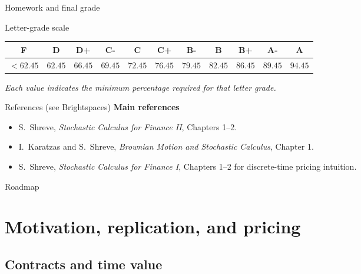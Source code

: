 \documentclass[handout,10pt,aspectratio=169]{beamer}
\begin{document}
\begin{frame}{Homework and final grade}
\begin{block}{Letter-grade scale}
\centering
\scriptsize
\renewcommand{\arraystretch}{0.95}
\begin{tabular}{@{}ccccccccccc@{}}
\toprule
\textbf{F} & \textbf{D} & \textbf{D+} & \textbf{C-} &
\textbf{C} & \textbf{C+} & \textbf{B-} & \textbf{B} &
\textbf{B+} & \textbf{A-} & \textbf{A} \\
\midrule
$<62.45$ &
$62.45$ &
$66.45$ &
$69.45$ &
$72.45$ &
$76.45$ &
$79.45$ &
$82.45$ &
$86.45$ &
$89.45$ &
$94.45$ \\
\bottomrule
\end{tabular}

\vspace{0.05em}
\textit{Each value indicates the minimum percentage required for that letter grade.}
\end{block}

\end{frame}

\begin{frame}{References (see Brightspaces)}
\footnotesize
\textbf{Main references}
\begin{itemize}\setlength{\itemsep}{0.5em}
  \item S.~Shreve, \emph{Stochastic Calculus for Finance II}, Chapters 1--2.
  \item I.~Karatzas and S.~Shreve, \emph{Brownian Motion and Stochastic Calculus}, Chapter 1.
  \item S.~Shreve, \emph{Stochastic Calculus for Finance I}, Chapters 1--2 for discrete-time pricing intuition.
\end{itemize}
\end{frame}

\begin{frame}{Roadmap}
  \tableofcontents[hideallsubsections]
\end{frame}

\section{Motivation, replication, and pricing}
\subsection{Contracts and time value}
\end{document}
